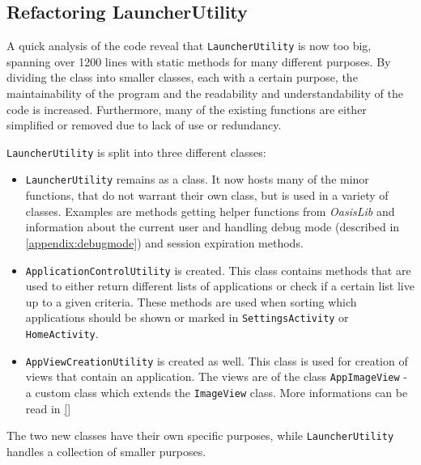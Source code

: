 \subsection{Refactoring LauncherUtility}\label{sect:sprint4:refactoring}

A quick analysis of the code reveal that \lstinline|LauncherUtility| is now too big, spanning over 1200 lines with static methods for many different purposes.
By dividing the class into smaller classes, each with a certain purpose, the maintainability of the program and the readability and understandability of the code is increased.
Furthermore, many of the existing functions are either simplified or removed due to lack of use or redundancy.

\lstinline|LauncherUtility| is split into three different classes:

\begin{itemize}
\item \lstinline|LauncherUtility| remains as a class.
It now hosts many of the minor functions, that do not warrant their own class, but is used in a variety of classes.
Examples are methods getting helper functions from \textit{OasisLib} and  information about the current user and handling debug mode (described in \cref{appendix:debugmode}) and session expiration methods.
\item \lstinline|ApplicationControlUtility| is created.
This class contains methods that are used to either return different lists of applications or check if a certain list live up to a given criteria.
These methods are used when sorting which applications should be shown or marked in \lstinline|SettingsActivity| or \lstinline|HomeActivity|.
\item \lstinline|AppViewCreationUtility| is created as well.
This class is used for creation of views that contain an application.
The views are of the class \lstinline|AppImageView| - a custom class which extends the \lstinline|ImageView| class.
More informations can be read in \cref{}
\end{itemize}

The two new classes have their own specific purposes, while \lstinline|LauncherUtility| handles a collection of smaller purposes.